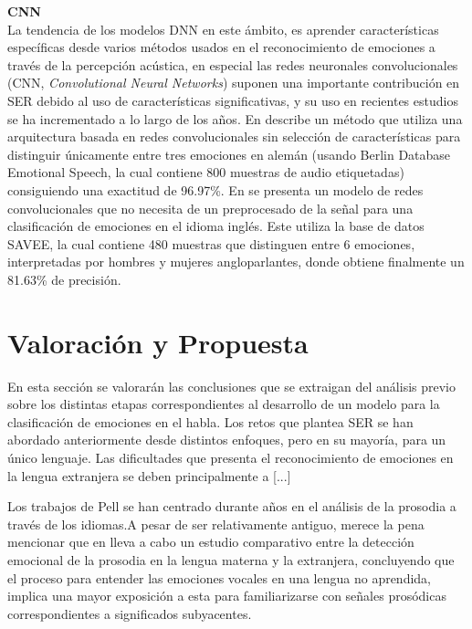 \documentclass[11pt,a4paper,spanish]{book}
\begin{document}
	\textbf{CNN}\\
	La tendencia de los modelos DNN en este ámbito, es aprender características específicas desde varios métodos usados en el reconocimiento de emociones a través de la percepción acústica, en especial las redes neuronales convolucionales (CNN, \emph{Convolutional Neural Networks}) suponen una importante contribución en SER debido al uso de características significativas, y su uso en recientes estudios se ha incrementado a lo largo de los años.
	En \cite{Harar2017} describe un método que utiliza una arquitectura basada en redes convolucionales sin selección de características para distinguir únicamente entre tres emociones en alemán (usando Berlin Database Emotional Speech, la cual contiene 800 muestras de audio etiquetadas) consiguiendo una exactitud de 96.97\%. En \cite{AbdulQayyum2019} se presenta un modelo de redes convolucionales que no necesita de un preprocesado de la señal para una clasificación de emociones en el idioma inglés. Este utiliza la base de datos SAVEE, la cual contiene 480 muestras que distinguen entre 6 emociones, interpretadas por hombres y mujeres angloparlantes, donde obtiene finalmente un 81.63\% de precisión.\newline
	
	\section{Valoración y Propuesta}
	En esta sección se valorarán las conclusiones que se extraigan del análisis previo sobre los distintas etapas correspondientes al desarrollo de un modelo para la clasificación de emociones en el habla. Los retos que plantea SER se han abordado anteriormente desde distintos enfoques, pero en su mayoría, para un único lenguaje. Las dificultades que presenta el reconocimiento de emociones en la lengua extranjera se deben principalmente a [...]\hfill \break
	
	Los trabajos de Pell se han centrado durante años en el análisis de la prosodia a través de los idiomas.A pesar de ser relativamente antiguo, merece la pena mencionar que en \cite{Pell2008} lleva a cabo un estudio comparativo entre la detección emocional de la prosodia en la lengua materna y la extranjera, concluyendo que el proceso para entender las emociones vocales en una lengua no aprendida, implica una mayor exposición a esta para familiarizarse con señales prosódicas correspondientes a significados subyacentes.\\
	
\end{document}

